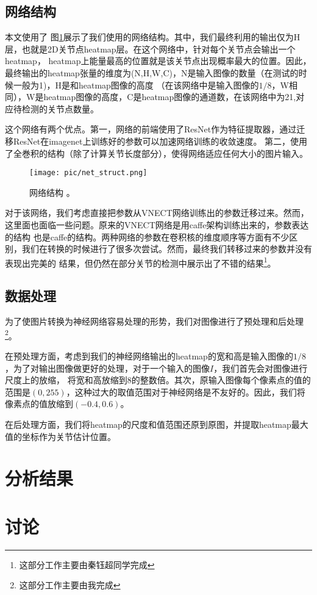 \documentclass[a4paper, 10pt]{article}
\begin{document}
\subsection{网络结构}
本文使用了
图\ref{pic:net_struct}展示了我们使用的网络结构。其中，我们最终利用的输出仅为H层，也就是2D关节点heatmap层。在这个网络中，针对每个关节点会输出一个heatmap，
heatmap上能量最高的位置就是该关节点出现概率最大的位置。因此，最终输出的heatmap张量的维度为(N,H,W,C)，N是输入图像的数量（在测试的时候一般为1)，H是和heatmap图像的高度
（在该网络中是输入图像的$1/8$，W相同），W是heatmap图像的高度，C是heatmap图像的通道数，在该网络中为21,对应待检测的关节点数量。

这个网络有两个优点。第一，网络的前端使用了ResNet\cite{he2016deep}作为特征提取器，通过迁移ResNet在imagenet上训练好的参数可以加速网络训练的收敛速度。
第二，使用了全巻积的结构（除了计算关节长度部分），使得网络适应任何大小的图片输入。

\begin{figure}[ht!]
    \centering
    \texttt{[image: pic/net\_struct.png]}
    \label{pic:net_struct}
    \caption{网络结构
    。}
\end{figure}

对于该网络，我们考虑直接把参数从VNECT网络训练出的参数迁移过来。然而，这里面也面临一些问题。原来的VNECT网络是用caffe架构训练出来的，参数表达的结构
也是caffe的结构。两种网络的参数在卷积核的维度顺序等方面有不少区别，我们在转换的时候进行了很多次尝试。然而，最终我们转移过来的参数并没有表现出完美的
结果，但仍然在部分关节的检测中展示出了不错的结果\footnote{这部分工作主要由秦钰超同学完成}。

\subsection{数据处理}
为了使图片转换为神经网络容易处理的形势，我们对图像进行了预处理和后处理\footnote{这部分工作主要由我完成}。

在预处理方面，考虑到我们的神经网络输出的heatmap的宽和高是输入图像的$1/8$，为了对输出图像做更好的处理，对于一个输入的图像$I$，我们首先会对图像进行尺度上的放缩，
将宽和高放缩到8的整数倍。其次，原输入图像每个像素点的值的范围是$(0,255)$，这种过大的取值范围对于神经网络是不友好的。因此，我们将像素点的值放缩到$(-0.4,0.6)$。

在后处理方面，我们将heatmap的尺度和值范围还原到原图，并提取heatmap最大值的坐标作为关节估计位置。

\section{分析结果}


\section{讨论}





\end{document}
